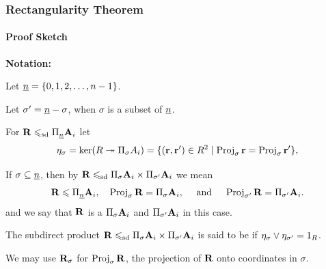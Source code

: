 \documentclass[xcolor=dvipsnames,9pt,hide notes,mathserif]{beamer}
\begin{document}
\begin{frame} \frametitle{Rectangularity Theorem}
  \framesubtitle{Proof Sketch}

  {\bf Notation:}

  \bigskip

  Let $\underline{n} =\{0, 1, 2, \dots, n-1\}$.

  \bigskip

  Let $\sigma' = \underline{n} -\sigma$, when $\sigma$ is a subset of $\underline{n}$.

  \bigskip

  For $\mathbf{R} \leqslant_{\mathrm{sd}} \Pi_{\underline{n}}\mathbf{A}_i$ %
  let
  \[
  \eta_\sigma = \ker(R \twoheadrightarrow \Pi_\sigma A_i) = \{(\mathbf{r}, \mathbf{r}') \in R^2 \mid
  \operatorname{Proj}_\sigma \mathbf{r} = \operatorname{Proj}_\sigma \mathbf{r}' \},
  \]


  If $\sigma\subseteq \underline{n}$, then by
  $\mathbf{R} \leqslant_{\mathrm{sd}} \Pi_\sigma \mathbf{A}_i \times \Pi_{\sigma'}\mathbf{A}_i$ we 
  mean
  \[
  \mathbf{R}\leqslant \Pi_{\underline{n}} \mathbf{A}_i, \quad 
\operatorname{Proj}_\sigma\mathbf{R} = \Pi_\sigma \mathbf{A}_i, \quad \text{ and }\quad
\operatorname{Proj}_{\sigma'}\mathbf{R} = \Pi_{\sigma'} \mathbf{A}_i.
\]
  and we say that $\mathbf{R}$ is a  
  $\Pi_\sigma \mathbf{A}_i$ and $\Pi_{\sigma'}\mathbf{A}_i$ in this case.

  \bigskip 

  The subdirect product $\mathbf{R} \leqslant_{\mathrm{sd}} \Pi_\sigma \mathbf{A}_i \times
  \Pi_{\sigma'}\mathbf{A}_i$ 
  is said to be  if $\eta_\sigma \vee \eta_{\sigma'} = 1_R$.

  \bigskip

  We may use $\mathbf{R}_\sigma$ for $\operatorname{Proj}_\sigma\mathbf{R}$, the projection 
  of $\mathbf{R}$ onto coordinates in $\sigma$.

  
\end{frame}
\end{document}
